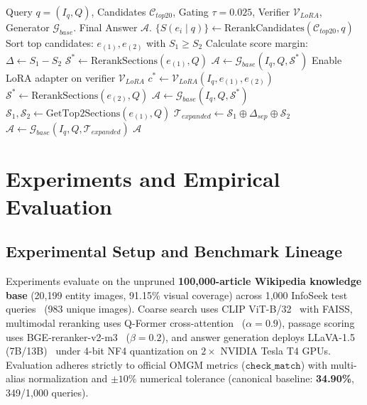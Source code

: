 \documentclass[conference]{IEEEtran}
\begin{document}
\begin{algorithm}[!htbp]
\caption{Adaptive Agentic Retrieval Decision Policy}
\label{alg:controller}
\begin{algorithmic}[1]
\footnotesize
\REQUIRE Query $q = (I_q, Q)$, Candidates $\mathcal{C}_{top20}$, Gating $\tau = 0.025$, Verifier $\mathcal{V}_{LoRA}$, Generator $\mathcal{G}_{base}$.
\ENSURE Final Answer $\mathcal{A}$.
\STATE $\{S(e_i \mid q)\} \leftarrow \text{RerankCandidates}(\mathcal{C}_{top20}, q)$
\STATE Sort top candidates: $e_{(1)}, e_{(2)}$ with $S_1 \ge S_2$
\STATE Calculate score margin: $\Delta \leftarrow S_1 - S_2$
\IF{$\Delta \ge \tau$}
    \STATE $\mathcal{S}^* \leftarrow \text{RerankSections}(e_{(1)}, Q)$ 
    \STATE $\mathcal{A} \leftarrow \mathcal{G}_{base}(I_q, Q, \mathcal{S}^*)$
\ELSE
    \STATE Enable LoRA adapter on verifier $\mathcal{V}_{LoRA}$ 
    \STATE $c^* \leftarrow \mathcal{V}_{LoRA}(I_q, e_{(1)}, e_{(2)})$
        \STATE $\mathcal{S}^* \leftarrow \text{RerankSections}(e_{(2)}, Q)$ 
        \STATE $\mathcal{A} \leftarrow \mathcal{G}_{base}(I_q, Q, \mathcal{S}^*)$ 
    \ELSE
        \STATE $\mathcal{S}_1, \mathcal{S}_2 \leftarrow \text{GetTop2Sections}(e_{(1)}, Q)$ 
        \STATE $\mathcal{T}_{expanded} \leftarrow \mathcal{S}_1 \oplus \Delta_{sep} \oplus \mathcal{S}_2$
        \STATE $\mathcal{A} \leftarrow \mathcal{G}_{base}(I_q, Q, \mathcal{T}_{expanded})$ 
    \ENDIF
\ENDIF
\RETURN $\mathcal{A}$
\end{algorithmic}
\end{algorithm}


\section{Experiments and Empirical Evaluation}

\subsection{Experimental Setup and Benchmark Lineage}
Experiments evaluate on the unpruned \textbf{100,000-article Wikipedia knowledge base} (20,199 entity images, 91.15\% visual coverage) across 1,000 InfoSeek test queries~\cite{infoseek} (983 unique images). Coarse search uses CLIP ViT-B/32~\cite{clip} with FAISS, multimodal reranking uses Q-Former cross-attention~\cite{blip2, omgm2025} ($\alpha = 0.9$), passage scoring uses BGE-reranker-v2-m3~\cite{bge_reranker} ($\beta = 0.2$), and answer generation deploys LLaVA-1.5 (7B/13B)~\cite{llava15} under 4-bit NF4 quantization on $2\times$ NVIDIA Tesla T4 GPUs. Evaluation adheres strictly to official OMGM metrics ($\mathtt{check\_match}$) with multi-alias normalization and $\pm 10\%$ numerical tolerance (canonical baseline: \textbf{34.90\%}, 349/1,000 queries).
\end{document}
